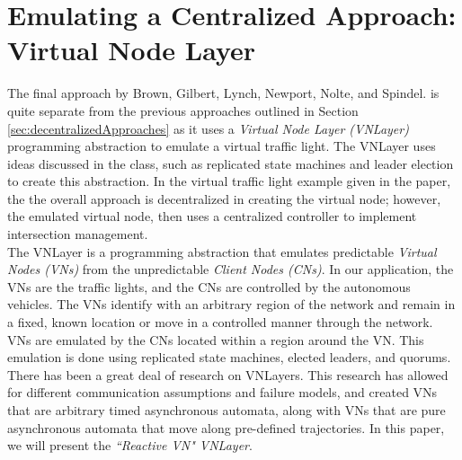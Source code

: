 \documentclass[12pt]{article}
\begin{document}
\section{Emulating a Centralized Approach: Virtual Node Layer}
\label{sec:VNLayer}
The final approach by Brown, Gilbert, Lynch, Newport, Nolte, and Spindel. \cite{vnlayer} is quite separate from the previous approaches outlined in Section \ref{sec:decentralizedApproaches} as it uses a {\em Virtual Node Layer (VNLayer)} programming abstraction to emulate a virtual traffic light.  The VNLayer uses ideas discussed in the class, such as replicated state machines and leader election to create this abstraction. In the virtual traffic light example given in the paper, the the overall approach is decentralized in creating the virtual node; however, the emulated virtual node, then uses a centralized controller to implement intersection management.  
\\
The VNLayer is a programming abstraction that emulates predictable {\em Virtual Nodes (VNs)} from the unpredictable {\em Client Nodes (CNs)}. In our application, the VNs are the traffic lights, and the CNs are controlled by the autonomous vehicles.  The VNs identify with an arbitrary region of the network and remain in a fixed, known location  or move in a controlled manner through the network.  VNs are emulated by the CNs located within a region around the VN.  This emulation is done using replicated state machines, elected leaders, and quorums.  
There has been a great deal of research on VNLayers\cite{vn1}\cite{vn2}\cite{vn3}\cite{vn4}.   
This research has allowed for different communication assumptions and failure models, and created VNs that are arbitrary timed asynchronous automata, along with VNs that are pure asynchronous automata that move along pre-defined trajectories. In this paper, we will present the {\em ``Reactive VN" VNLayer}.\cite{vnlayer}
\end{document}

